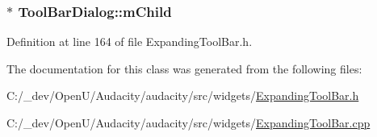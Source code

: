 \subsubsection[{\texorpdfstring{m\+Child}{mChild}}]{$\ast$ Tool\+Bar\+Dialog\+::m\+Child\hspace{0.3cm}{\ttfamily [protected]}}\hypertarget{class_tool_bar_dialog_ab3fc930f40bf76d7a18158e05fdf2fb3}{}\label{class_tool_bar_dialog_ab3fc930f40bf76d7a18158e05fdf2fb3}


Definition at line 164 of file Expanding\+Tool\+Bar.\+h.



The documentation for this class was generated from the following files\+:\begin{DoxyCompactItemize}
\item 
C\+:/\+\_\+dev/\+Open\+U/\+Audacity/audacity/src/widgets/\hyperlink{_expanding_tool_bar_8h}{Expanding\+Tool\+Bar.\+h}\item 
C\+:/\+\_\+dev/\+Open\+U/\+Audacity/audacity/src/widgets/\hyperlink{_expanding_tool_bar_8cpp}{Expanding\+Tool\+Bar.\+cpp}\end{DoxyCompactItemize}
